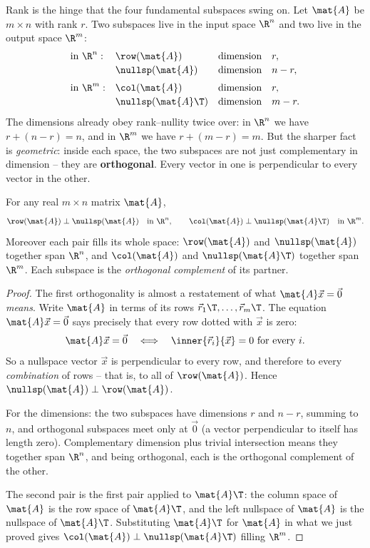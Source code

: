 Rank is the hinge that the four fundamental subspaces swing on. Let $\mat{A}$ be
$m\times n$ with rank $r$. Two subspaces live in the input space $\R^n$ and two
live in the output space $\R^m$:
\[
  \begin{array}{llcl}
  \text{in } \R^n: & \row(\mat{A}) & \text{dimension} & r,\\[2pt]
                   & \nullsp(\mat{A}) & \text{dimension} & n-r,\\[6pt]
  \text{in } \R^m: & \col(\mat{A}) & \text{dimension} & r,\\[2pt]
                   & \nullsp(\mat{A}\T) & \text{dimension} & m-r.
  \end{array}
\]
The dimensions already obey rank--nullity twice over: in $\R^n$ we have
$r + (n-r) = n$, and in $\R^m$ we have $r + (m-r) = m$. But the sharper fact is
\emph{geometric}: inside each space, the two subspaces are not just
complementary in dimension -- they are \textbf{orthogonal}. Every vector in one is
perpendicular to every vector in the other.

\begin{theorem}\label{ch16:orthog}
For any real $m\times n$ matrix $\mat{A}$,
\[
  \row(\mat{A}) \perp \nullsp(\mat{A}) \quad\text{in } \R^n,
  \qquad
  \col(\mat{A}) \perp \nullsp(\mat{A}\T) \quad\text{in } \R^m.
\]
Moreover each pair fills its whole space: $\row(\mat{A})$ and $\nullsp(\mat{A})$
together span $\R^n$, and $\col(\mat{A})$ and $\nullsp(\mat{A}\T)$ together span
$\R^m$. Each subspace is the \emph{orthogonal complement} of its partner.
\end{theorem}

\begin{proof}
The first orthogonality is almost a restatement of what $\mat{A}\vec{x}=\vec0$
\emph{means}. Write $\mat{A}$ in terms of its rows
$\vec{r}_1\T,\dots,\vec{r}_m\T$. The equation $\mat{A}\vec{x}=\vec0$ says
precisely that every row dotted with $\vec{x}$ is zero:
\[
  \mat{A}\vec{x} = \vec0
  \quad\Longleftrightarrow\quad
  \inner{\vec{r}_i}{\vec{x}} = 0 \text{ for every } i.
\]
So a nullspace vector $\vec{x}$ is perpendicular to every row, and therefore to
every \emph{combination} of rows -- that is, to all of $\row(\mat{A})$. Hence
$\nullsp(\mat{A}) \perp \row(\mat{A})$.

For the dimensions: the two subspaces have dimensions $r$ and $n-r$, summing to
$n$, and orthogonal subspaces meet only at $\vec0$ (a vector perpendicular to
itself has length zero). Complementary dimension plus trivial intersection means
they together span $\R^n$, and being orthogonal, each is the orthogonal
complement of the other.

The second pair is the first pair applied to $\mat{A}\T$: the column space of
$\mat{A}$ is the row space of $\mat{A}\T$, and the left nullspace of $\mat{A}$ is
the nullspace of $\mat{A}\T$. Substituting $\mat{A}\T$ for $\mat{A}$ in what we
just proved gives $\col(\mat{A}) \perp \nullsp(\mat{A}\T)$ filling $\R^m$.
\end{proof}

